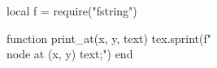 \begin{luacode*}

local f = require("fstring")

function print_at(x, y, text)
	tex.sprint(f"\\node at ({x}, {y}) {{{text}}};")
end

\end{luacode*}

